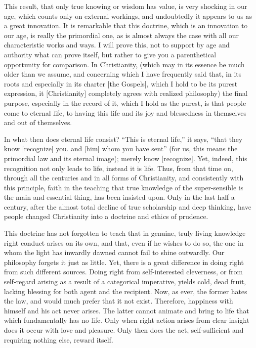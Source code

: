 This result, that only true knowing or wisdom has value,
is very shocking in our age, which counts only on external workings,
and undoubtedly it appears to us as a great innovation.
It is remarkable that this doctrine,
which is an innovation to our age,
is really the primordial one, as is almost always the
case with all our characteristic works and ways.
I will prove this, not to support by age and authority
what can prove itself, but rather to give you
a parenthetical opportunity for comparison.
In Christianity, (which may in its essence
be much older than we assume,
and concerning which I have frequently said that,
in its roots and especially in its charter [the Gospels],
which I hold to be its purest expression,
it [Christianity] completely agrees with realized philosophy)
the final purpose, especially in the record of it,
which I hold as the purest,
is that people come to eternal life,
to having this life and its joy and blessedness
in themselves and out of themselves.

In what then does eternal life consist?
“This is eternal life,” it says,
“that they know [recognize] you.
and [him] whom you have sent”
(for us, this means the primordial law
and its eternal image);
merely know [recognize].
Yet, indeed, this recognition not
only leads to life, instead it is life.
Thus, from that time on,
through all the centuries and
in all forms of Christianity,
and consistently with this principle,
faith in the teaching that
true knowledge of the super-sensible is
the main and essential thing,
has been insisted upon.
Only in the last half a century,
after the almost total decline of
true scholarship and deep thinking,
have people changed Christianity into
a doctrine and ethics of prudence.

This doctrine has not forgotten to teach
that in genuine, truly living knowledge
right conduct arises on its own,
and that, even if he wishes to do so,
the one in whom the light has inwardly dawned
cannot fail to shine outwardly.
Our philosophy forgets it just as little.
Yet, there is a great difference
in doing right from such different sources.
Doing right from self-interested cleverness,
or from self-regard arising as a result of
a categorical imperative, yields cold, dead fruit,
lacking blessing for both agent and the recipient.
Now, as ever, the former hates the law,
and would much prefer that it not exist.
Therefore, happiness with himself and his act never arises.
The latter cannot animate and bring to life
that which fundamentally has no life.
Only when right action arises from clear insight
does it occur with love and pleasure.
Only then does the act, self-sufficient
and requiring nothing else, reward itself.
